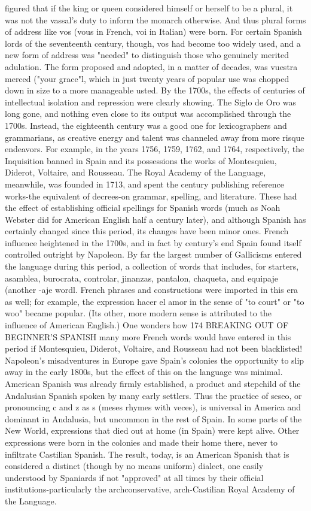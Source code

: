 \documentclass[14pt,a4paper,oneside]{memoir}
\begin{document}
{{{{figured that if the king or queen considered himself or herself to be a
plural, it was not the vassal's duty to inform the monarch otherwise.
And thus plural forms of address like vos (vous in French, voi in Italian) were born. For certain Spanish lords of the seventeenth century,
though, vos had become too widely used, and a new form of address
was "needed" to distinguish those who genuinely merited adulation.
The form proposed and adopted, in a matter of decades, was vuestra
merced ("your grace"l, which in just twenty years of popular use was
chopped down in size to a more manageable usted.
By the 1700s, the effects of centuries of intellectual isolation
and repression were clearly showing. The Siglo de Oro was long gone,
and nothing even close to its output was accomplished through the
1700s. Instead, the eighteenth century was a good one for lexicographers and grammarians, as creative energy and talent was channeled
away from more risque endeavors. For example, in the years 1756,
1759, 1762, and 1764, respectively, the Inquisition banned in Spain and
its possessions the works of Montesquieu, Diderot, Voltaire, and Rousseau. The Royal Academy of the Language, meanwhile, was founded in
1713, and spent the century publishing reference works-the equivalent of decrees-on grammar, spelling, and literature. These had the
effect of establishing official spellings for Spanish words (much as
Noah Webster did for American English half a century later), and although Spanish has certainly changed since this period, its changes
have been minor ones.
French influence heightened in the 1700s, and in fact by century's end Spain found itself controlled outright by Napoleon. By far
the largest number of Gallicisms entered the language during this period, a collection of words that includes, for starters, asamblea, burocrata, controlar, jinanzas, pantalon, chaqueta, and equipaje (another
-aje wordl. French phrases and constructions were imported in this era
as well; for example, the expression hacer el amor in the sense of "to
court" or "to woo" became popular. (Its other, more modern sense is
attributed to the influence of American English.) One wonders how
174 BREAKING OUT OF BEGINNER'S SPANISH
many more French words would have entered in this period if Montesquieu, Diderot, Voltaire, and Rousseau had not been blacklisted!
Napoleon's misadventures in Europe gave Spain's colonies the
opportunity to slip away in the early 1800s, but the effect of this on
the language was minimal. American Spanish was already firmly established, a product and stepchild of the Andalusian Spanish spoken by
many early settlers. Thus the practice of seseo, or pronouncing c and z
as s (meses rhymes with veces), is universal in America and dominant
in Andalusia, but uncommon in the rest of Spain. In some parts of the
New World, expressions that died out at home (in Spain) were kept
alive. Other expressions were born in the colonies and made their
home there, never to infiltrate Castilian Spanish. The result, today, is
an American Spanish that is considered a distinct (though by no means
uniform) dialect, one easily understood by Spaniards if not "approved"
at all times by their official institutions-particularly the archconservative, arch-Castilian Royal Academy of the Language.

}}}}
\end{document}

